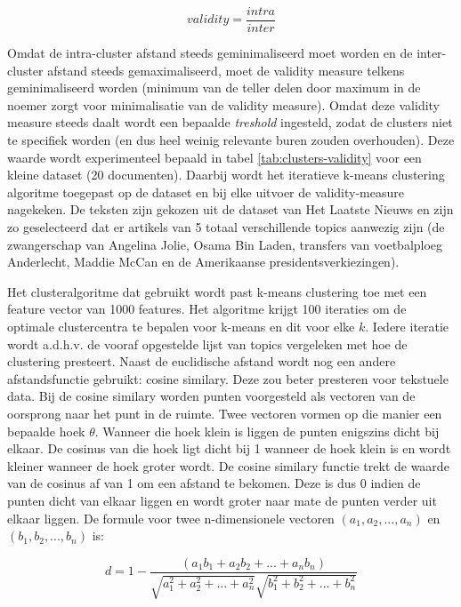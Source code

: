 \begin{equation}
validity = \frac{intra}{inter}
\end{equation}

Omdat de intra-cluster afstand steeds geminimaliseerd moet worden en de inter-cluster afstand steeds gemaximaliseerd, moet de validity measure telkens geminimaliseerd worden (minimum van de teller delen door maximum in de noemer zorgt voor minimalisatie van de validity measure). Omdat deze validity measure steeds daalt wordt een bepaalde \textit{treshold} ingesteld, zodat de clusters niet te specifiek worden (en dus heel weinig relevante buren zouden overhouden). Deze waarde wordt experimenteel bepaald in tabel \ref{tab:clusters-validity} voor een kleine dataset (20 documenten). Daarbij wordt het iteratieve k-means clustering algoritme toegepast op de dataset en bij elke uitvoer de validity-measure nagekeken. De teksten zijn gekozen uit de dataset van Het Laatste Nieuws en zijn zo geselecteerd dat er artikels van 5 totaal verschillende topics aanwezig zijn (de zwangerschap van Angelina Jolie, Osama Bin Laden, transfers van voetbalploeg Anderlecht, Maddie McCan en de Amerikaanse presidentsverkiezingen).

Het clusteralgoritme dat gebruikt wordt past k-means clustering toe met een feature vector van 1000 features. Het algoritme krijgt 100 iteraties om de optimale clustercentra te bepalen voor k-means en dit voor elke $k$. Iedere iteratie wordt a.d.h.v. de vooraf opgestelde lijst van topics vergeleken met hoe de clustering presteert. Naast de euclidische afstand wordt nog een andere afstandsfunctie \cite{Huang2008} gebruikt: cosine similary. Deze zou beter presteren voor tekstuele data. Bij de cosine similary \cite{Owen2011} worden punten voorgesteld als vectoren van de oorsprong naar het punt in de ruimte. Twee vectoren vormen op die manier een bepaalde hoek $\theta$. Wanneer die hoek klein is liggen de punten enigszins dicht bij elkaar. De cosinus van die hoek ligt dicht bij 1 wanneer de hoek klein is en wordt kleiner wanneer de hoek groter wordt. De cosine similary functie trekt de waarde van de cosinus af van 1 om een afstand te bekomen. Deze is dus 0 indien de punten dicht van elkaar liggen en wordt groter naar mate de punten verder uit elkaar liggen. De formule voor twee n-dimensionele vectoren $(a_1, a_2, ... , a_n)$ en $(b_1, b_2, ... , b_n)$ is:

\begin{equation}
d = 1 - \frac{(a_1b_1+a_2b_2+ ... + a_nb_n)}{\sqrt{a_1^2 + a_2^2 + ... + a_n^2} \sqrt{b_1^2 + b_2^2 + ... + b_n^2}}
\end{equation}

